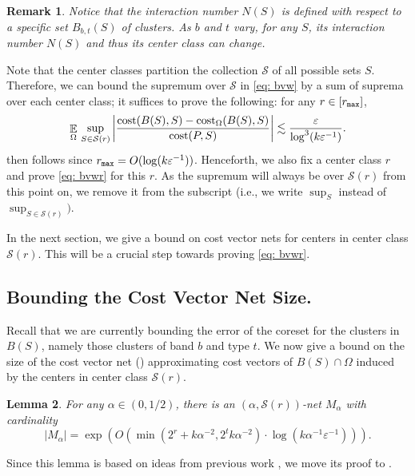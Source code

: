 \documentclass[11pt]{article}
\newtheorem{lemma}{Lemma}[section]
\newtheorem{remark}[lemma]{Remark}
\theoremstyle{restate}
\theoremstyle{definition}
\newcommand{\eps}{\ensuremath{\varepsilon}}
\newcommand{\E}{\mathop{\mathbb{E}}}
\newcommand{\cost}{\textnormal{cost}}
\newcommand{\costom}{\cost_\Omega} %
\newcommand{\rmax}{r_\ensuremath{\textnormal{\texttt{max}}}}
\begin{document}
\begin{remark}
Notice that the interaction number $N(S)$ is defined with respect to a specific set $B_{b,t}(S)$ of clusters. As $b$ and $t$ vary, for any $S$, its interaction number $N(S)$ and thus its center class can change.
\end{remark}

Note that the center classes partition the collection $\mathcal{S}$ of all possible sets $S$. Therefore, we can bound the supremum over $\mathcal{S}$ in \eqref{eq: bvw} by a sum of suprema over each center class; it suffices to prove the following: for any $r \in [\rmax]$,
\begin{align}\label{eq: bvwr}
     \E_{\Omega}\, \sup_{S \in \mathcal{S} (r)}\left\rvert\frac{\cost(B(S), S) - \costom(B(S), S)}{\cost(P,S)} \right\rvert  \lesssim \frac{\eps}{ \log^3(k \eps^{-1})}. 
\end{align}
 then follows since $\rmax = O(\log(k \eps^{-1}))$.
  Henceforth, we also fix a center class  $r$ and prove \eqref{eq: bvwr} for this $r$. As the supremum will always be over $\mathcal{S}(r)$ from this point on, we remove it from the subscript (i.e., we write $\sup_S$ instead of $\sup_{S \in \mathcal{S}(r)})$. 


In the next section, we give a bound on cost vector nets for centers in center class $\mathcal{S}(r)$. This will be a crucial step towards proving \eqref{eq: bvwr}.


\subsection{Bounding the Cost Vector Net Size.}\label{sec: cost-vector-net}
Recall that we are currently bounding the error of the coreset for the clusters in $B(S)$, namely those clusters of band $b$ and type $t$. We now give a bound on the size of the cost vector net () approximating cost vectors of $B(S) \cap \Omega$ induced by the centers in center class $\mathcal{S}(r)$.  
\begin{lemma}\label{lem: net-lemma}
 For any $\alpha \in (0,1/2)$, there is an $(\alpha, \mathcal{S}(r))$-net $M_\alpha$ with cardinality \[|M_\alpha| = \exp(O(\min(2^r+ k\alpha^{-2}, 2^t k \alpha^{-2})\cdot \log(k \alpha^{-1}{\eps^{-1}}))).\]
\end{lemma}
\noindent Since this lemma is based on ideas from previous work \cite{Cohen-AddadSS21}, we move its proof to .
\end{document}
